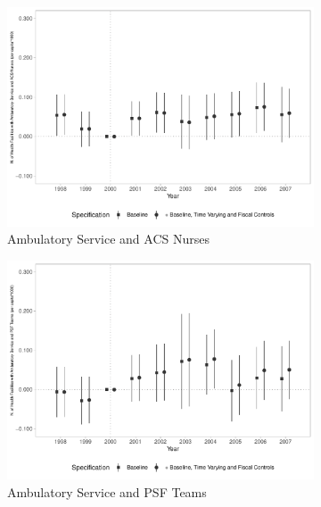 \begin{figure}[h!]
\begin{center}
\begin{subfigure}{0.32\textwidth}
    \end{subfigure}
    \begin{subfigure}{0.32\textwidth}
        \centering
        \caption{\scriptsize Ambulatory Service and ACS Nurses}\label{fig:12c}
        \includegraphics[width=\textwidth]{plots/sia_ncnes_enfacs_pcapita_dist_ec29_baseline_dist_ec29_baseline_12.pdf}
    \end{subfigure}
    \begin{subfigure}{0.32\textwidth}
        \centering
        \caption{\scriptsize Ambulatory Service and PSF Teams}\label{fig:12d}
        \includegraphics[width=\textwidth]{plots/sia_ncnes_psf_pcapita_dist_ec29_baseline_dist_ec29_baseline_12.pdf}
    \end{subfigure}
    \begin{subfigure}{0.32\textwidth}

\end{subfigure}
\end{center}
\end{figure}

